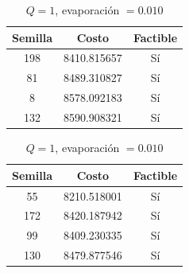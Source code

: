 \documentclass{article}
\begin{document}
    \begin{table}[H]
      \begin{minipage}{0.5\linewidth}
        \centering
        \caption{$Q=100$, evaporación $= 0.2$}
        \begin{tabular}{c c c}
          \hline
          Semilla & Costo & Factible \\
          \hline
          198     & 8410.815657 & Sí \\
          81      & 8489.310827 & Sí \\
          8       & 8578.092183 & Sí \\
          132     & 8590.908321 & Sí \\
        \end{tabular}
      \end{minipage}
      \begin{minipage}{0.5\linewidth}
        \centering
        \caption{$Q=1$, evaporación $= 0.010$}
        \begin{tabular}{c c c}
          \hline
          Semilla & Costo & Factible   \\
          \hline
          55      & 8210.518001  & Sí  \\
          172     & 8420.187942  & Sí  \\
          99      & 8409.230335  & Sí  \\
          130     & 8479.877546  & Sí  \\
        \end{tabular}
      \end{minipage}
    \end{table}
\end{document}
